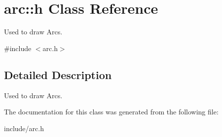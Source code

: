 \hypertarget{classarc_1_1h}{}\section{arc\+:\+:h Class Reference}
\label{classarc_1_1h}


Used to draw Arcs.  




{\ttfamily \#include $<$arc.\+h$>$}



\subsection{Detailed Description}
Used to draw Arcs. 

The documentation for this class was generated from the following file\+:\begin{DoxyCompactItemize}
\item 
include/arc.\+h\end{DoxyCompactItemize}

